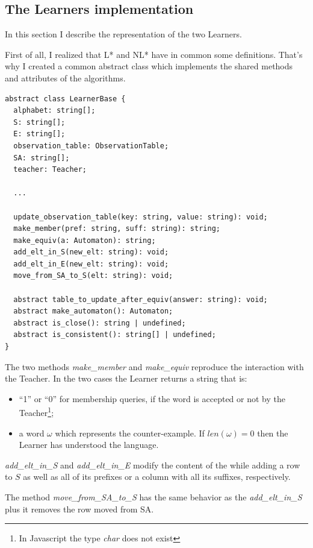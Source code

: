 \subsection{The Learners implementation}

In this section I describe the representation of the two Learners.

First of all, I realized that L* and NL* have in common some definitions. That's why I created a common abstract class which implements the shared methods and attributes of the algorithms.

\begin{verbatim}
abstract class LearnerBase {
  alphabet: string[];
  S: string[];
  E: string[];
  observation_table: ObservationTable;
  SA: string[];
  teacher: Teacher;

  ...

  update_observation_table(key: string, value: string): void;
  make_member(pref: string, suff: string): string;
  make_equiv(a: Automaton): string;
  add_elt_in_S(new_elt: string): void;
  add_elt_in_E(new_elt: string): void;
  move_from_SA_to_S(elt: string): void;

  abstract table_to_update_after_equiv(answer: string): void;
  abstract make_automaton(): Automaton;
  abstract is_close(): string | undefined;
  abstract is_consistent(): string[] | undefined;
}
\end{verbatim}

The two methods \textit{make\_member} and \textit{make\_equiv} reproduce the interaction with the Teacher. In the two cases the Learner returns a string that is:

\begin{itemize}
  \item ``1'' or ``0'' for membership queries, if the word is accepted or not by the Teacher\footnote{In Javascript the type \textit{char} does not exist};
  \item a word $\omega$ which represents the counter-example. If $len(\omega) = 0$ then the Learner has understood the language.
\end{itemize}

\textit{add\_elt\_in\_S} and \textit{add\_elt\_in\_E} modify the content of the \OT while adding a row to $S$ as well as all of its prefixes or a column with all its suffixes, respectively.

The method \textit{move\_from\_SA\_to\_S} has the same behavior as the \textit{add\_elt\_in\_S} plus it removes the row moved from SA.

